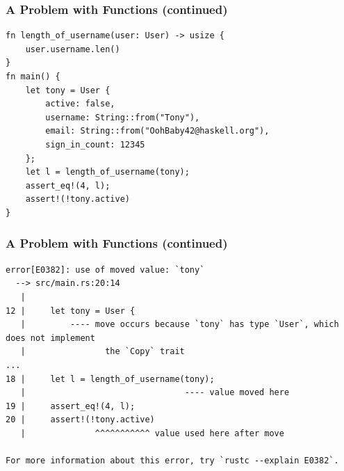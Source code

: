 \documentclass{slides}
\begin{document}
\begin{frame}[fragile]
\frametitle{A Problem with Functions (continued)}
\begin{verbatim}
fn length_of_username(user: User) -> usize {
    user.username.len()
}
fn main() {
    let tony = User {
        active: false,
        username: String::from("Tony"),
        email: String::from("OohBaby42@haskell.org"),
        sign_in_count: 12345
    };
    let l = length_of_username(tony);
    assert_eq!(4, l);
    assert!(!tony.active)
}
\end{verbatim}
\end{frame}

\begin{frame}[fragile]
\frametitle{A Problem with Functions (continued)}
\begin{verbatim}
error[E0382]: use of moved value: `tony`
  --> src/main.rs:20:14
   |
12 |     let tony = User {
   |         ---- move occurs because `tony` has type `User`, which does not implement 
   |                the `Copy` trait
...
18 |     let l = length_of_username(tony);
   |                                ---- value moved here
19 |     assert_eq!(4, l);
20 |     assert!(!tony.active)
   |              ^^^^^^^^^^^ value used here after move

For more information about this error, try `rustc --explain E0382`.
\end{verbatim}
\end{frame}
\end{document}
